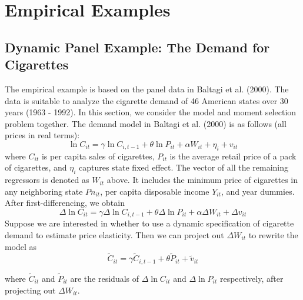 \section{Empirical Examples}
\label{sec:empirical}

\subsection{Dynamic Panel Example: The Demand for Cigarettes}
\label{sec:cigarettes}

The empirical example is based on the panel data in Baltagi et al. (2000). The data is suitable to analyze the cigarette demand of 46 American states over 30 years (1963 - 1992). In this section, we consider the model and moment selection problem together. The demand model in Baltagi et al. (2000) is as follows (all prices in real terms): 
\[
\ln C_{it} =  \gamma \ln C_{i,t-1} + \theta \ln P_{it} + \alpha W_{it} + \eta_i +  v_{it}
\] 
where $C_{it}$ is per capita sales of cigarettes, $P_{it}$ is the average retail price of a pack of cigarettes, and $\eta_i$ captures state fixed effect. The vector of all the remaining regressors is denoted as $W_{it}$ above. It includes the minimum price of cigarettes in any neighboring state $Pn_{it}$, per capita disposable income $Y_{it}$, and year dummies. After first-differencing, we obtain 
\[
\Delta \ln C_{it} = \gamma \Delta \ln C_{i,t-1} +  \theta \Delta \ln P_{it} +\alpha \Delta W_{it} +  \Delta v_{it}
\]
 Suppose we are interested in whether to use a dynamic specification of cigarette demand to estimate price elasticity. Then we can project out $\Delta W_{it}$ to rewrite the model as
\[
\widetilde{C}_{it} = \gamma \widetilde{C}_{i,t-1} + \theta \widetilde{P}_{it} + \widetilde{v}_{it} 
\] 
 
 where $\widetilde{C}_{it}$ and $\widetilde{P}_{it}$ are the residuals of $\Delta \ln C_{it}$ and $\Delta \ln P_{it}$ respectively, after projecting out $\Delta W_{it}$.
 
